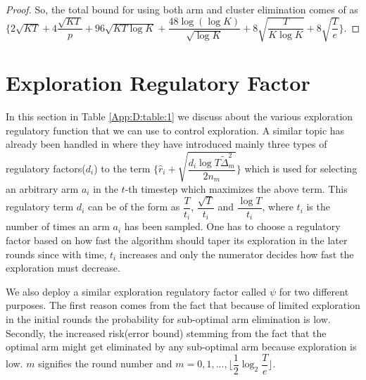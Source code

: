 \begin{proof}
	So, the total bound for using both arm and cluster elimination comes of as $\bigg\lbrace 2\sqrt{KT} + 4\dfrac{\sqrt{KT}}{p} + 96\sqrt{KT\log K} + \dfrac{48\log{(\log K)}}{\sqrt{\log K}} + 8\sqrt{\dfrac{T}{K\log K}} + 8\sqrt{\dfrac{T}{e}}\bigg\rbrace$.
\end{proof}


\section{Exploration Regulatory Factor}
\label{App:D}
In this section in Table \ref{App:D:table:1} we discuss about the various exploration regulatory function that we can use to control exploration. A similar topic has already been handled in \cite{liu2016modification} where they have introduced mainly three types of regulatory factors($d_{i}$) to the term $\bigg\lbrace\hat{r}_{i}+\sqrt{\dfrac{d_{i}\log T\tilde{\Delta}_{m}^{2}}{2n_{m}}}\bigg\rbrace$ which is used for selecting an arbitrary arm $a_{i}$ in the $t$-th timestep which maximizes the above term. This regulatory term $d_{i}$ can be of the form as $\dfrac{T}{t_{i}}$, $\dfrac{\sqrt{T}}{t_{i}}$ and $\dfrac{\log T}{t_{i}}$, where $t_{i}$ is the number of times an arm $a_{i}$ has been sampled. One has to choose a regulatory factor based on how fast the algorithm should taper its exploration in the later rounds since with time, $t_{i}$ increases and only the numerator decides how fast the exploration must decrease.

 We also deploy a similar exploration regulatory factor called $\psi$ for two different purposes. The first reason comes from the fact that because of limited exploration in the initial rounds the probability for sub-optimal arm elimination is low. Secondly, the increased risk(error bound) stemming from the fact that the optimal arm might get eliminated by any sub-optimal arm because exploration is low. $m$ signifies the round number and $m=0,1,...,\big \lfloor \dfrac{1}{2}\log_{2} \dfrac{T}{e}\big\rfloor$.
	
